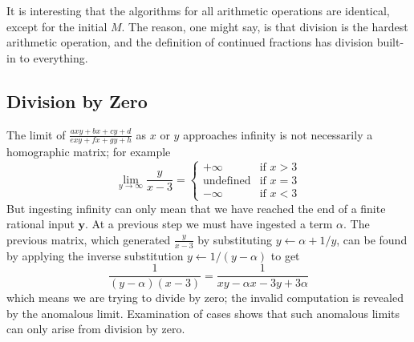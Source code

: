 \documentclass[11pt, oneside]{amsart}   	%
\renewcommand{\:}{\negthickspace:\negthickspace}
\begin{document}
It is interesting that the algorithms for all arithmetic operations are identical, except for the initial $M$. The reason, one might say, is
that division is the hardest arithmetic operation, and the definition of continued fractions has division built-in to everything.


\subsection{Division by Zero}\label{sec:anomalous}
The limit of $\frac{axy + bx + cy + d}{exy + fx + gy + h}$ as $x$ or $y$ approaches infinity is not necessarily a homographic matrix; for example
\[
\lim_{y \to \infty} \frac{y}{x-3} = \begin{cases}
                                                          +\infty & \mbox{if } x > 3 \\
                                                          \mbox{undefined} & \mbox{if } x=3 \\
                                                          -\infty & \mbox{if } x < 3
                                                         \end{cases}
\]
But ingesting infinity can only mean that we have reached the end of a finite rational input $\mathbf{y}$. At a previous step we
must have ingested a term $\alpha$. The previous matrix, which generated $\frac{y}{x-3}$ by substituting $y \leftarrow \alpha + 1/y$, can be found by applying the inverse substitution $y \leftarrow 1/(y-\alpha)$ to get
\[
\frac{1}{(y-\alpha)(x-3)} = \frac{1}{xy - \alpha x -3y +3\alpha}
\]
which means we are trying to divide by zero; the invalid computation is revealed by the anomalous limit.
Examination of cases shows that such anomalous limits can only arise from division by zero.
\end{document}

